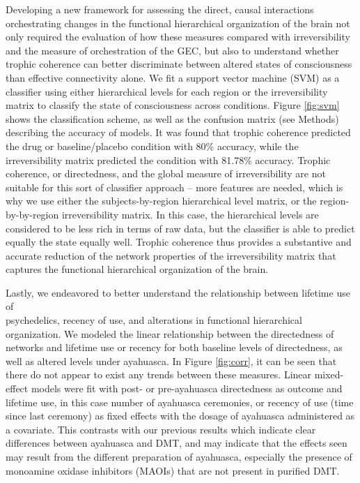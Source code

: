Developing a new framework for assessing the direct, causal interactions
orchestrating changes in the functional hierarchical organization of the
brain not only required the evaluation of how these measures compared
with irreversibility and the measure of orchestration of the GEC, but
also to understand whether trophic coherence can better discriminate
between altered states of consciousness than effective connectivity
alone. We fit a support vector machine (SVM) as a classifier using
either hierarchical levels for each region or the irreversibility matrix to
classify the state of consciousness across conditions. Figure \ref{fig:svm} shows
the classification scheme, as well as the confusion matrix (see Methods)
describing the accuracy of models. It was found that trophic coherence
predicted the drug or baseline/placebo condition with 80\% accuracy,
while the irreversibility matrix predicted the condition with 81.78\% accuracy. Trophic coherence, or directedness, and the global measure of irreversibility are not suitable for this sort of classifier approach -- more features are needed, which is why we use either the subjects-by-region hierarchical level matrix, or the region-by-by-region irreversibility matrix. In this case, the hierarchical levels are considered to be less rich in terms of raw data, but the classifier is able to predict equally the state equally well. Trophic coherence thus provides a
substantive and accurate reduction of the network properties of the irreversibility matrix that captures the functional hierarchical
organization of the brain.

Lastly, we endeavored to better understand the relationship between lifetime use of\\ psychedelics, recency of use, and alterations in functional hierarchical organization. We modeled the linear relationship
between the directedness of networks and lifetime use or recency for
both baseline levels of directedness, as well as altered levels under
ayahuasca. In Figure \ref{fig:corr}, it can be seen that there do not appear to exist
any trends between these measures. Linear mixed-effect models were fit
with post- or pre-ayahuasca directedness as outcome and lifetime use, in
this case number of ayahuasca ceremonies, or recency of use (time since
last ceremony) as fixed effects with the dosage of ayahuasca
administered as a covariate. This contrasts with our previous results
which indicate clear differences between ayahuasca and DMT, and may
indicate that the effects seen may result from the different preparation
of ayahuasca, especially the presence of monoamine oxidase inhibitors
(MAOIs) that are not present in purified DMT.

